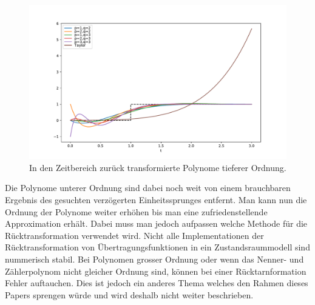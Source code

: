 \begin{figure}[!h]
	\centering
	\includegraphics[width=1\linewidth]{./papers/pade/python/bilder/padelow33.pdf}
	\caption{In den Zeitbereich zurück transformierte Polynome tieferer Ordnung\label{pade:totzeitexp2}.}
\end{figure}

Die Polynome unterer Ordnung sind dabei noch weit von einem brauchbaren Ergebnis des gesuchten verzögerten Einheitssprunges entfernt.
Man kann nun die Ordnung der Polynome weiter erhöhen bis man eine zufriedenstellende Approximation erhält.
Dabei muss man jedoch aufpassen welche Methode für die Rücktransformation verwendet wird.
Nicht alle Implementationen der Rücktransformation von Übertragungsfunktionen in ein Zustandsraummodell sind nummerisch stabil. 
Bei Polynomen grosser Ordnung oder wenn das Nenner- und Zählerpolynom nicht gleicher Ordnung sind, können bei einer Rücktarnformation Fehler auftauchen.
Dies ist jedoch ein anderes Thema welches den Rahmen dieses Papers sprengen würde und wird deshalb nicht weiter beschrieben.


